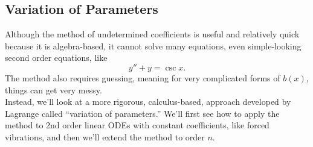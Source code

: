 \subsection{Variation of Parameters}
\noindent
Although the method of undetermined coefficients is useful and relatively quick because it is algebra-based, it cannot solve many equations, even simple-looking second order equations, like
\begin{equation*}
	y'' + y = \csc{x}.
\end{equation*}
The method also requires guessing, meaning for very complicated forms of $b(x)$, things can get very messy.\\

\noindent
Instead, we'll look at a more rigorous, calculus-based, approach developed by Lagrange called ``variation of parameters.''
We'll first see how to apply the method to 2nd order linear ODEs with constant coefficients, like forced vibrations, and then we'll extend the method to order $n$.


